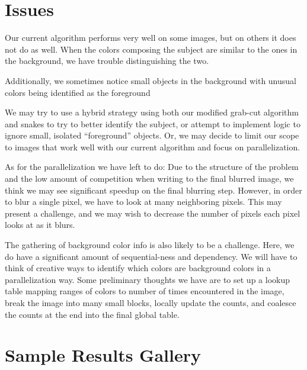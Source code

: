 \documentclass[12pt]{article}
\begin{document}
\section{Issues}

Our current algorithm performs very well on some images, but on others it does
not do as well. When the colors composing the subject are similar to the ones
in the background, we have trouble distinguishing the two.

Additionally, we sometimes notice small objects in the background with unusual
colors being identified as the foreground

We may try to use a hybrid strategy using both our modified grab-cut algorithm
and snakes to try to better identify the subject, or attempt to implement logic
to ignore small, isolated ``foreground'' objects. Or, we may decide to limit
our scope to images that work well with our current algorithm and focus on
parallelization.

As for the parallelization we have left to do: Due to the structure of the
problem and the low amount of competition when writing to the final blurred
image, we think we may see significant speedup on the final blurring step.
However, in order to blur a single pixel, we have to look at many neighboring
pixels. This may present a challenge, and we may wish to decrease the number of
pixels each pixel looks at as it blurs.

The gathering of background color info is also likely to be a challenge. Here,
we do have a significant amount of sequential-ness and dependency. We will have
to think of creative ways to identify which colors are background colors in a
parallelization way. Some preliminary thoughts we have are to set up a lookup
table mapping ranges of colors to number of times encountered in the image,
break the image into many small blocks, locally update the counts, and coalesce
the counts at the end into the final global table.

\section{Sample Results Gallery}
\end{document}
